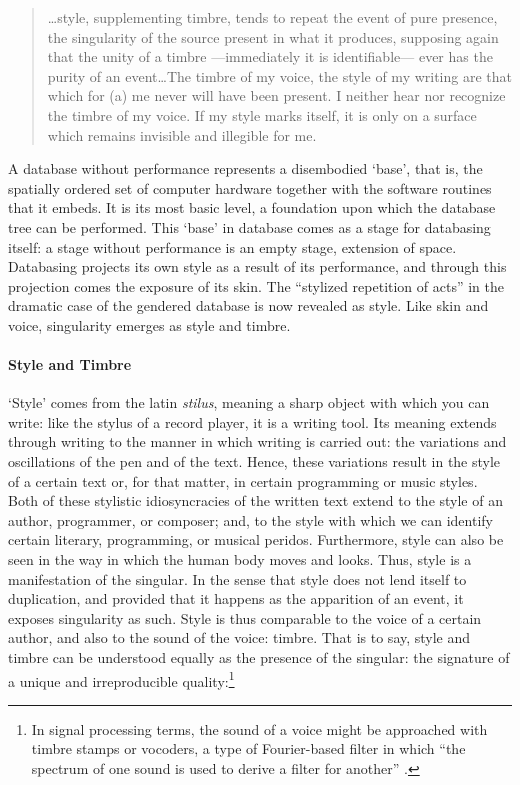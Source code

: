 \begin{quote}
	\dots style, supplementing timbre, tends to repeat the event of pure presence, the singularity of the source present in what it produces, supposing again that the unity of a timbre ---immediately it is identifiable--- ever has the purity of an event\dots The timbre of my voice, the style of my writing are that which for (a) me never will have been present. I neither hear nor recognize the timbre of my voice. If my style marks itself, it is only on a surface which remains invisible and illegible for me. \parencite[296]{Der82:Mar}

\end{quote}

A database without performance represents a disembodied `base', that is, the spatially ordered set of computer hardware together with the software routines that it embeds. It is its most basic level, a foundation upon which the database tree can be performed. This `base' in database comes as a stage for databasing itself: a stage without performance is an empty stage, extension of space. Databasing projects its own style as a result of its performance, and through this projection comes the exposure of its skin. The ``stylized repetition of acts''  \parencite[519]{But88:Per} in the dramatic case of the gendered database is now revealed as style. Like skin and voice, singularity emerges as style and timbre.

\paragraph{Style and Timbre}
`Style' comes from the latin \textit{stilus}, meaning a sharp object with which you can write: like the stylus of a record player, it is a writing tool. Its meaning extends through writing to the manner in which writing is carried out: the variations and oscillations of the pen and of the text. Hence, these variations result in the style of a certain text or, for that matter, in certain programming or music styles. Both of these stylistic idiosyncracies of the written text extend to the style of an author, programmer, or composer; and, to the style with which we can identify certain literary, programming, or musical peridos. Furthermore, style can also be seen in the way in which the human body moves and looks. Thus, style is a manifestation of the singular. In the sense that style does not lend itself to duplication, and provided that it happens as the apparition of an event, it exposes singularity as such. Style is thus comparable to the voice of a certain author, and also to the sound of the voice: timbre. That is to say, style and timbre can be understood equally as the presence of the singular: the signature of a unique and irreproducible quality:\footnote{In signal processing terms, the sound of a voice might be approached with timbre stamps or vocoders, a type of Fourier-based filter in which ``the spectrum of one sound is used to derive a filter for another'' \parencite{DBLP:conf/icmc/Puckette07}.} 


